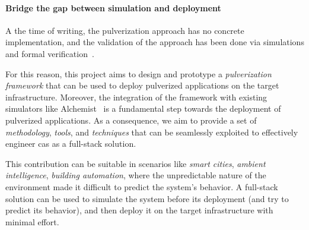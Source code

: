 \documentclass[12pt,a4paper]{article}
\begin{document}
\paragraph{Bridge the gap between simulation and deployment}\label{sec:bridge-gap}

A the time of writing,
the pulverization approach has no concrete implementation,
and the validation of the approach has been done via simulations and formal verification~\cite{DBLP:journals/fi/CasadeiPPVW20, DBLP:journals/iotj/CasadeiFPPSV22}.

For this reason,
this project aims to design and prototype a \emph{pulverization framework} that can be used to deploy pulverized applications on the target infrastructure.
%
Moreover,
the integration of the framework with existing simulators like Alchemist~\cite{DBLP:journals/jos/PianiniMV13} is a fundamental step towards the deployment of pulverized applications.
%
As a consequence,
we aim to provide a set of \emph{methodology},
\emph{tools},
and \emph{techniques} that can be seamlessly exploited to effectively engineer \ac{cas} as a full-stack solution.

This contribution can be suitable in scenarios like \emph{smart cities},
\emph{ambient intelligence},
\emph{building automation},
where the unpredictable nature of the environment made it difficult to predict the system's behavior.
%
A full-stack solution can be used to simulate the system before its deployment (and try to predict its behavior),
and then deploy it on the target infrastructure with minimal effort.
\end{document}
